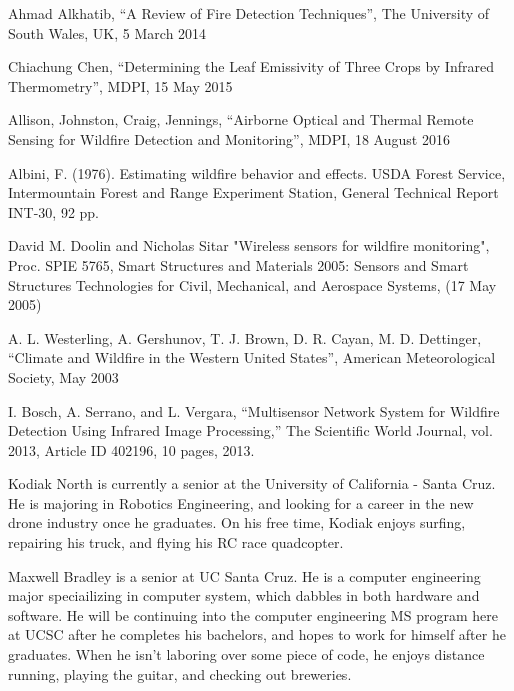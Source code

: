 \documentclass[12pt,journal,compsoc]{IEEEtran}
\begin{document}
\begin{thebibliography}{2}
Ahmad Alkhatib, “A Review of Fire Detection Techniques”, The University of South Wales, UK, 5 March 2014

Chiachung Chen, “Determining the Leaf Emissivity of Three Crops by Infrared Thermometry”, MDPI, 15 May 2015

Allison, Johnston, Craig, Jennings, “Airborne Optical and Thermal Remote Sensing for Wildfire Detection and Monitoring”, MDPI, 18 August 2016

Albini, F. (1976). Estimating wildfire behavior and effects. USDA Forest Service, Intermountain Forest and Range Experiment Station, General Technical Report INT-30, 92 pp.

David M. Doolin and Nicholas Sitar "Wireless sensors for wildfire monitoring", Proc. SPIE 5765, Smart Structures and Materials 2005: Sensors and Smart Structures Technologies for Civil, Mechanical, and Aerospace Systems, (17 May 2005)

A. L. Westerling, A. Gershunov, T. J. Brown, D. R. Cayan, M. D. Dettinger, “Climate and Wildfire in the Western United States”, American Meteorological Society, May 2003

I. Bosch, A. Serrano, and L. Vergara, “Multisensor Network System for Wildfire Detection Using Infrared Image Processing,” The Scientific World Journal, vol. 2013, Article ID 402196, 10 pages, 2013.


\end{thebibliography}

\begin{IEEEbiographynophoto}{Kodiak North}
is currently a senior at the University of California - Santa Cruz. He is majoring in Robotics Engineering, and looking for a career in the new drone industry once he graduates. On his free time, Kodiak enjoys surfing, repairing his truck, and flying his RC race quadcopter.
\end{IEEEbiographynophoto}

\begin{IEEEbiographynophoto}{Maxwell Bradley}
is a senior at UC Santa Cruz. He is a computer engineering major speciailizing in computer system, which dabbles in both hardware and software. He will be continuing into the computer engineering MS program here at UCSC after he completes his bachelors, and hopes to work for himself after he graduates. When he isn't laboring over some piece of code, he enjoys distance running, playing the guitar, and checking out breweries.
\end{IEEEbiographynophoto}
\end{document}
